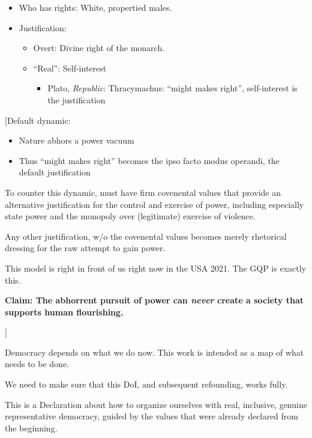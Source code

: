 \documentclass[
]{book}
\providecommand{\tightlist}{%
  \setlength{\itemsep}{0pt}\setlength{\parskip}{0pt}}
\begin{document}
\begin{itemize}
\tightlist
\item
  Who has rights: White, propertied males.
\item
  Justification:

  \begin{itemize}
  \tightlist
  \item
    Overt: Divine right of the monarch.
  \item
    ``Real'': Self-interest

    \begin{itemize}
    \tightlist
    \item
      Plato, \emph{Republic}: Thracymachus: ``might makes right'', self-interest is the justification
    \end{itemize}
  \end{itemize}
\end{itemize}

{[}Default dynamic:

\begin{itemize}
\tightlist
\item
  Nature abhors a power vacuum
\item
  Thus ``might makes right'' becomes the ipso facto modus operandi, the default justification
\end{itemize}

To counter this dynamic, must have firm covenental values that provide an alternative justification for the control and exercise of power, including especially state power and the monopoly over (legitimate) exercise of violence.

Any other justification, w/o the covenental values becomes merely rhetorical dressing for the raw attempt to gain power.

This model is right in front of us right now in the USA 2021. The GQP is exactly this.

\textbf{Claim: The abhorrent pursuit of power can \emph{never} create a society that supports human flourishing.}

{]}

Democracy depends on what we do now. This work is intended as a map of what needs to be done.

We need to make sure that this DoI, and subsequent refounding, works fully.

This is a Declaration about how to organize ourselves with real, inclusive, genuine representative democracy, guided by the values that were already declared from the beginning.
\end{document}
